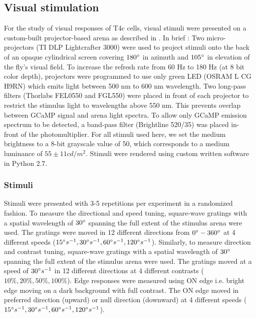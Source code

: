 \documentclass[9pt,lineno]{elife}
\begin{document}
\subsection{Visual stimulation}
For the study of visual responses of T4c cells, visual stimuli were presented on a custom-built projector-based arena as described in \parencite{Arenz2017}. In brief : Two micro-projectors (TI DLP Lightcrafter 3000) were used to project stimuli onto the back of an opaque cylindrical screen covering $180\degree$ in azimuth and $105\degree$ in elevation of the fly's visual field. To increase the refresh rate from 60 Hz to 180 Hz (at 8 bit color depth), projectors were programmed to use only green LED (OSRAM L CG H9RN) which emits light between 500 nm to 600 nm wavelength. Two long-pass filters (Thorlabs FEL0550 and FGL550) were placed in front of each projector to restrict the stimulus light to wavelengths above 550 nm. This prevents overlap between GCaMP signal and arena light spectra. To allow only GCaMP emission spectrum to be detected, a band-pass filter (Brightline 520/35) was placed in-front of the photomultiplier. For all stimuli used here, we set the medium brightness to a 8-bit grayscale value of 50, which corresponds to a medium luminance of $55 \pm 11 cd/m^2$. Stimuli were rendered using custom written software in Python 2.7. 

\subsubsection{Stimuli}
Stimuli were presented with 3-5 repetitions per experiment in a randomized fashion. To measure the directional and speed tuning, square-wave gratings with a spatial wavelength of $30\degree$ spanning the full extent of the stimulus arena were used. The gratings were moved in 12 different directions from $0\degree - 360\degree$ at 4 different speeds ($15\degree s^{-1},30\degree s^{-1},60\degree s^{-1},120\degree s^{-1}$). Similarly, to measure direction and contrast tuning, square-wave gratings with a spatial wavelength of $30\degree$ spanning the full extent of the stimulus arena were used. The gratings moved at a speed of $30\degree s^{-1}$ in 12 different directions at 4 different contrasts ($10\%, 20\%, 50\%, 100\%$). Edge responses were measured using ON edge i.e. bright edge moving on a dark background with full contrast. The ON edge moved in preferred direction (upward) or null direction (downward) at 4 different speeds ($15\degree s^{-1},30\degree s^{-1},60\degree s^{-1},120\degree s^{-1}$).
\end{document}
